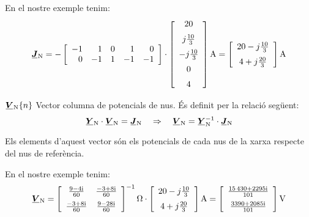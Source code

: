 \begin{list}{}
   En el nostre exemple tenim:
   \[
      \mcmplx{J}\ped{N} = -
      \begin{bmatrix}\begin{array}{rrrrr} 
      	-1 & 1  & 0 &  1 & 0 \\  0 & -1 & 1 & -1 & -1
      \end{array}\end{bmatrix} \cdot
      \begin{bmatrix}\begin{array}{c}
            20 \\[2mm]
             j \frac{10}{3} \\[2mm]
             -j \frac{10}{3} \\[2mm]
             0 \\[2mm]
              4
      \end{array}\end{bmatrix}\unit{A}
      =
      \begin{bmatrix}\begin{array}{c}
            20 - j \frac{10}{3} \\[2mm]
            4 + j \frac{20}{3}
      \end{array}\end{bmatrix}\unit{A}
   \]

   \item[$\mcmplx{V}\ped{N}\{n\}$] Vector columna de potencials de nus. És definit per la relació següent:
   \begin{equation}
      \mcmplx{Y}\ped{N} \cdot \mcmplx{V}\ped{N} = \mcmplx{J}\ped{N} \quad\Rightarrow\quad
      \mcmplx{V}\ped{N} = \mcmplx{Y}\ped{N}^{-1} \cdot \mcmplx{J}\ped{N} \label{eq:vn}
   \end{equation}

   Els elements d'aquest vector són els potencials de cada nus de la xarxa respecte del nus de referència.

   En el nostre exemple tenim:
   \[
      \mcmplx{V}\ped{N} =
      \begin{bmatrix}\begin{array}{cc}
            \frac{\complexnum{ 9 - j 4}}{60} & \frac{\complexnum{-3 + j 8}}{60} \\[2mm]
            \frac{\complexnum{-3 + j 8}}{60} & \frac{\complexnum{9 - j 28}}{60}
      \end{array}\end{bmatrix}^{-1}\unit{\ohm} \cdot
      \begin{bmatrix}\begin{array}{c}
            20 - j \frac{10}{3} \\[2mm]
            4 + j \frac{20}{3}
      \end{array}\end{bmatrix}\unit{A}
      =
      \begin{bmatrix}\begin{array}{c}
            \frac{\complexnum{15430 + j 2295}}{101} \\[2mm]
            \frac{\complexnum{3390 + j 2085}}{101}
      \end{array}\end{bmatrix}\unit{V}
      \label{eq:vn-exemp}
   \]


\end{list}
